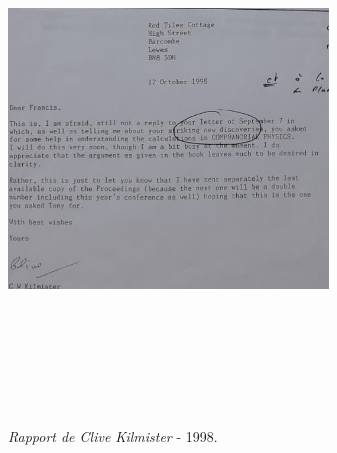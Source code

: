\documentclass[a4paper,12pt]{article}
\begin{document}
\begin{appendix}
\begin{figure}
\centering
\includegraphics[width=8.5cm,height=14.5cm]{./figures/kilmister.jpg}
\caption[Rapport de Kilmister]{\textit{Rapport de Clive Kilmister} -  1998.} 
\label{fig:15:figure15}
\end{figure}


\end{appendix}
\end{document}
